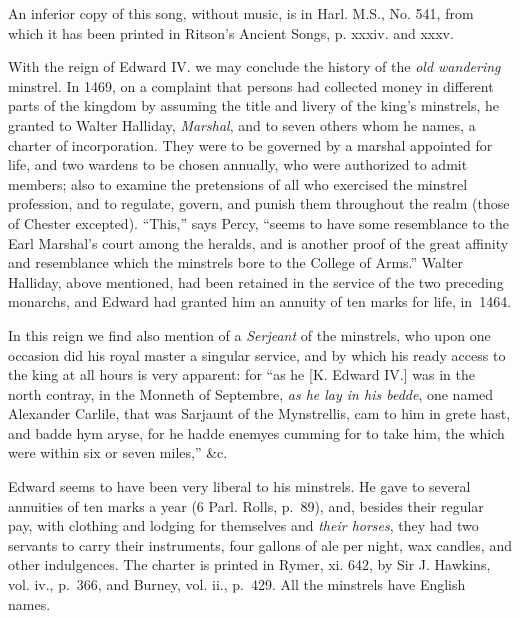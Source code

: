 An inferior copy of this song, without music, is in Harl. M.S., No. 541, from
which it has been printed in Ritson’s Ancient Songs, p. xxxiv. and xxxv.

With the reign of Edward IV. we may conclude the history of the \textit{old wandering}
minstrel. In 1469, on a complaint that persons had collected money in different
parts of the kingdom by assuming the title and livery of the king’s minstrels, he
granted to Walter Halliday, \textit{Marshal}, and to seven others whom he names,
a charter of incorporation. They were to be governed by a marshal appointed for
life, and two wardens to be chosen annually, who were authorized to admit members; 
also to examine the pretensions of all who exercised the minstrel profession, \pagebreak
and to regulate, govern, and punish them 
throughout the realm (those of Chester 
excepted). “This,” says Percy, “seems to have some resemblance to the Earl
Marshal’s court among the heralds, and is another proof of the great affinity and
resemblance which the minstrels bore to the College of Arms.” Walter Halliday,
above mentioned, had been retained in the service of the two preceding monarchs,
and Edward had granted him an annuity of ten marks for life, in~1464.

In this reign we find also mention of a \textit{Serjeant} of the minstrels, who upon
one occasion did his royal master a singular service, and by which his ready access
to the king at all hours is very apparent: for “as he [K. Edward IV.] was in
the north contray, in the Monneth of Septembre, \textit{as he lay in his bedde}, one
named Alexander Carlile, that was Sarjaunt of the Mynstrellis, cam to him
in grete hast, and badde hym aryse, for he hadde enemyes cumming for to take
him, the which were within six or seven miles,” \&c.

Edward seems to have been very liberal to his minstrels. He gave to several
annuities of ten marks a year (6 Parl. Rolls, p.~89), and, besides their
regular pay, with clothing and lodging for themselves and \textit{their horses}, they had
two servants to carry their instruments, four gallons of ale per night, wax candles,
and other indulgences. The charter is printed in Rymer, xi. 642, by Sir
J. Hawkins, vol. iv., p.~366, and Burney, vol. ii., p.~429. All the minstrels
have English names.

